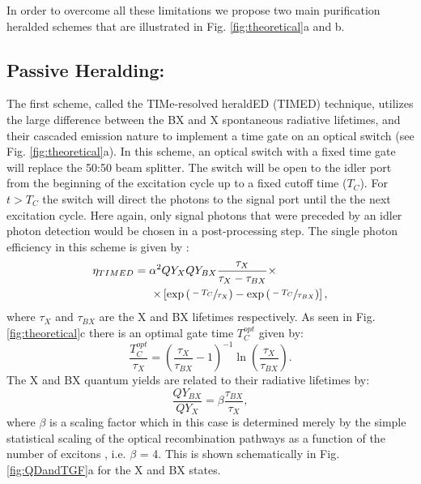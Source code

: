 \documentclass[journal=nalefd,manuscript=letter]{achemso}
\begin{document}
In order to overcome all these limitations we propose two main purification heralded schemes that are illustrated in Fig. \ref{fig:theoretical}a and b. 
\subsection{Passive Heralding:}
The first scheme, called the TIMe-resolved heraldED (TIMED) technique, utilizes the large difference between the BX and X spontaneous radiative lifetimes, and their cascaded emission nature to implement a time gate on an optical switch (see Fig. \ref{fig:theoretical}a).
In this scheme, an optical switch with a fixed time gate will replace the 50:50 beam splitter. 
The switch will be open to the idler port from the beginning of the excitation cycle  up to a fixed cutoff time ($T_C$). 
For $t>T_C$ the switch will direct the photons to the signal port until the the next excitation cycle.
Here again, only signal photons that were preceded by an idler photon detection would be chosen in a post-processing step.  The single photon efficiency in this scheme is given by \cite{supp}:
\begin{equation}
\begin{split}
\eta_{TIMED}=\alpha^2 & QY_X QY_{BX}\frac{\tau_X}{\tau_X-\tau_{BX}}\times \\ \times&\left[ \exp\left(\sfrac{-T_C}{\tau_X}\right)-\exp\left(\sfrac{-T_C}{\tau_{BX}}\right)\right],
\label{eq: etaTIMED}
\end{split}
\end{equation}
where $\tau_X$ and $\tau_{BX}$ are the X and BX lifetimes respectively.
As seen in Fig. \ref{fig:theoretical}c there is an optimal gate time $T_C^{opt}$  given by:
\begin{equation*}
\frac{T_C^{opt}}{\tau_X}= \left(\frac{\tau_X}{\tau_{BX}}-1\right)^{-1} \ln\left(\frac{\tau_X}{\tau_{BX}}\right). 
\label{eq: Tcopt}
\end{equation*}
The X and BX quantum yields are related to their radiative lifetimes by:
\begin{equation}
\frac{QY_{BX}}{QY_X}=\beta\frac{\tau_{BX}}{\tau_{X}},
\label{eq: QYratio}
\end{equation}
where $\beta$ is a scaling factor which in this case is determined merely by the simple statistical scaling of the optical recombination pathways as a function of the number of excitons \cite{Park2014AugerDots,Matsuzaki2017StrongAntenna}, i.e. $\beta$ = 4. This is shown schematically in Fig. \ref{fig:QDandTGF}a for the X and BX states.
\end{document}
